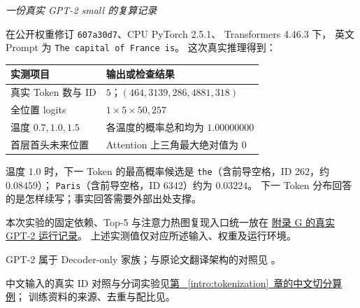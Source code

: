 \begin{example}
\noindent\emph{一份真实 GPT-2 small 的复算记录}\par
在公开权重修订 \texttt{607a30d7}、CPU PyTorch 2.5.1、
Transformers 4.46.3 下，
英文 Prompt 为 \texttt{The capital of France is}。
这次真实推理得到：

\begin{center}\small
{}
\begin{tabularx}{\linewidth}{@{}p{41mm}X@{}}
\toprule
实测项目 & 输出或检查结果\\\midrule
真实 Token 数与 ID & $5$；$(464,3139,286,4881,318)$\\
全位置 logits & $1\times5\times50{,}257$\\
温度 $0.7,1.0,1.5$ & 各温度的概率总和均为 $1.00000000$\\
首层首头未来位置 & Attention 上三角最大绝对值为 $0$\\
\bottomrule
\end{tabularx}
\end{center}

温度 $1.0$ 时，下一 Token 的最高概率候选是
\texttt{the}（含前导空格，ID 262，约 $0.08459$）；
\texttt{Paris}（含前导空格，ID 6342）约为 $0.03224$。
下一 Token 分布回答的是怎样续写；事实回答需要外部出处支撑。


本次实验的固定依赖、Top-5 与注意力热图复现入口统一放在
\hyperref[app:revision-notes]{附录 G 的真实 GPT-2 运行记录}。
上述实测值仅对应所述输入、权重及运行环境。
\end{example}

GPT-2 属于 Decoder-only 家族；与原论文翻译架构的对照见
。

中文输入的真实 ID 对照与分词实验见\hyperref[experiment:real-chinese-tokenizer]{第~
\ref*{intro:tokenization}~章的中文切分算例}；
训练资料的来源、去重与配比见。

